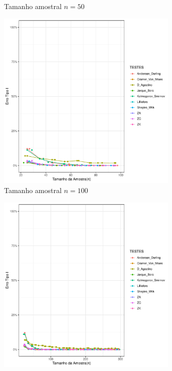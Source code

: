 \documentclass[a4paper,11pt]{article} %
\begin{document}
\begin{figure}[H]
\begin{subfigure}[b]{0.45\textwidth}
        \caption{Tamanho amostral \(n = 50\)}
        \label{fig:cauchy_50}
    \end{subfigure}
    
    \vspace{0.5cm} %
    \begin{subfigure}[b]{0.45\textwidth}
        \centering
        \includegraphics[width=0.95\textwidth]{Distribuição Cauchy/Erro Tipo I/erro_tipo_I_cauchy_100.pdf}
        \caption{Tamanho amostral \(n = 100\)}
        \label{fig:cauchy_100}
    \end{subfigure}
    \hfill
    \begin{subfigure}[b]{0.45\textwidth}
        \centering
        \includegraphics[width=0.95\textwidth]{Distribuição Cauchy/Erro Tipo I/erro_tipo_I_cauchy_300.pdf}

\end{subfigure}
\end{figure}
\end{document}
